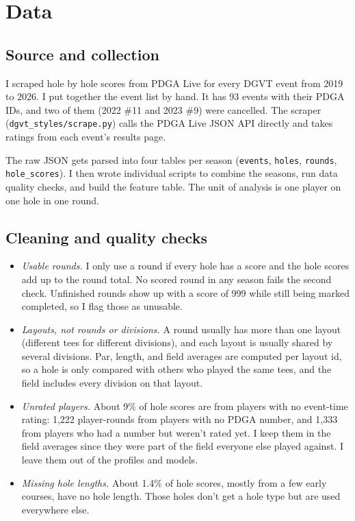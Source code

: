 \documentclass[10pt]{article}
\begin{document}
\section{Data}

\subsection{Source and collection}

I scraped hole by hole scores from PDGA Live for every DGVT event from 2019 to 2026. I put together the event list by hand. It has 93 events with their PDGA IDs, and two of them (2022 \#11 and 2023 \#9) were cancelled. The scraper (\texttt{dgvt\_styles/scrape.py}) calls the PDGA Live JSON API directly and takes ratings from each event's results page.

The raw JSON gets parsed into four tables per season (\texttt{events}, \texttt{holes}, \texttt{rounds}, \texttt{hole\_scores}). I then wrote individual scripts to combine the seasons, run data quality checks, and build the feature table. The unit of analysis is one player on one hole in one round.

\subsection{Cleaning and quality checks}

\begin{itemize}
  \item \emph{Usable rounds.} I only use a round if every hole has a score and the hole scores add up to the round total. No scored round in any season fails the second check. Unfinished rounds show up with a score of 999 while still being marked completed, so I flag those as unusable.
  \item \emph{Layouts, not rounds or divisions.}  A round usually has more than one layout (different tees for different divisions), and each layout is usually shared by several divisions. Par, length, and field averages are computed per layout id, so a hole is only compared with others who played the same tees, and the field includes every division on that layout.
  \item \emph{Unrated players.} About 9\% of hole scores are from players with no event-time rating: 1,222 player-rounds from players with no PDGA number, and 1,333 from players who had a number but weren't rated yet. I keep them in the field averages since they were part of the field everyone else played against. I leave them out of the profiles and models.
  \item \emph{Missing hole lengths.} About 1.4\% of hole scores, mostly from a few early courses, have no hole length. Those holes don't get a hole type but are used everywhere else.
\end{itemize}
\end{document}

